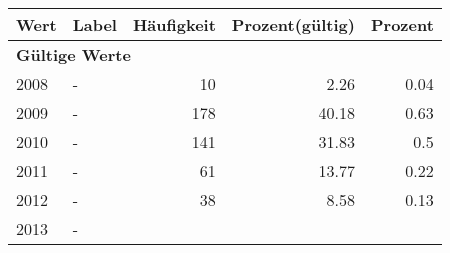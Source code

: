      \begin{longtable}{lXrrr}
     \toprule
     \textbf{Wert} & \textbf{Label} & \textbf{Häufigkeit} & \textbf{Prozent(gültig)} & \textbf{Prozent} \\
     \endhead
     \midrule
     \multicolumn{5}{l}{\textbf{Gültige Werte}}\\

     2008 &
     \multicolumn{1}{X}{ -  } &


       \num{10} &
       \num[round-mode=places,round-precision=2]{2.26} &
         \num[round-mode=places,round-precision=2]{0.04} \\

     2009 &
     \multicolumn{1}{X}{ -  } &


       \num{178} &
       \num[round-mode=places,round-precision=2]{40.18} &
         \num[round-mode=places,round-precision=2]{0.63} \\

     2010 &
     \multicolumn{1}{X}{ -  } &


       \num{141} &
       \num[round-mode=places,round-precision=2]{31.83} &
         \num[round-mode=places,round-precision=2]{0.5} \\

     2011 &
     \multicolumn{1}{X}{ -  } &


       \num{61} &
       \num[round-mode=places,round-precision=2]{13.77} &
         \num[round-mode=places,round-precision=2]{0.22} \\

     2012 &
     \multicolumn{1}{X}{ -  } &


       \num{38} &
       \num[round-mode=places,round-precision=2]{8.58} &
         \num[round-mode=places,round-precision=2]{0.13} \\

     2013 &
     \multicolumn{1}{X}{ -  } &



\end{longtable}
